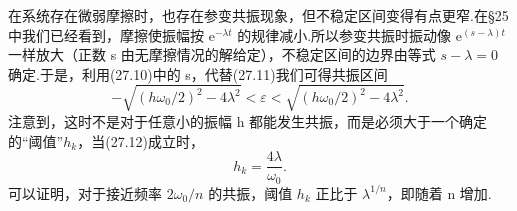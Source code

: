 在系统存在微弱摩擦时，也存在参变共振现象，但不稳定区间变得有点更窄.在§25中我们已经看到，摩擦使振幅按 $\mathrm{e}^{-\lambda t}$ 的规律减小.所以参变共振时振动像 $\mathrm{e}^{(s-\lambda)t}$ 一样放大（正数 s 由无摩擦情况的解给定），不稳定区间的边界由等式 $s-\lambda=0$ 确定.于是，利用(27.10)中的 s，代替(27.11)我们可得共振区间
\begin{equation}
  -\sqrt{\left(h\omega_0/2\right)^2-4\lambda^2}<\varepsilon
  <\sqrt{\left(h\omega_0/2\right)^2-4\lambda^2}.
\end{equation}
注意到，这时不是对于任意小的振幅 h 都能发生共振，而是必须大于一个确定的“阈值”$h_k$，当(27.12)成立时，
\begin{equation*}
  h_k=\frac{4\lambda}{\omega_0}.
\end{equation*}
可以证明，对于接近频率 $2\omega_0/n$ 的共振，阈值 $h_k$ 正比于 $\lambda^{1/n}$，即随着 n 增加.

